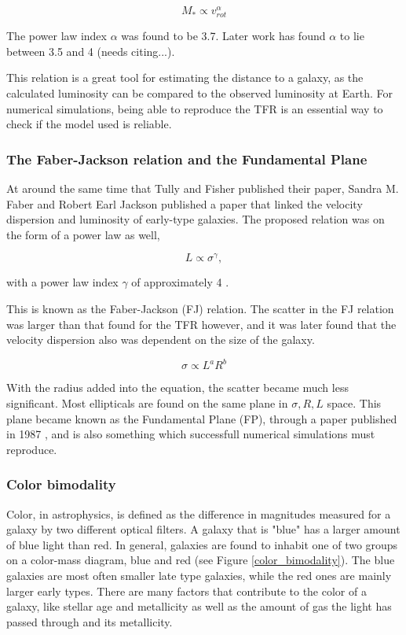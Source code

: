 \begin{equation}
    M_* \propto v_{rot}^\alpha 
\end{equation}

The power law index $\alpha$ was found to be 3.7. Later work has found $\alpha$ to lie between 3.5 and 4 (needs citing...).

This relation is a great tool for estimating the distance to a galaxy, as the calculated luminosity can be compared to the observed luminosity at Earth. For numerical simulations, being able to reproduce the TFR is an essential way to check if the model used is reliable.

\subsubsection{The Faber-Jackson relation and the Fundamental Plane}
At around the same time that Tully and Fisher published their paper, Sandra M. Faber and Robert Earl Jackson published a paper that linked the velocity dispersion and luminosity of early-type galaxies. The proposed relation was on the form of a power law as well,

\begin{equation}
    L \propto \sigma^{\gamma},
\end{equation}

with a power law index $\gamma$ of approximately 4 \parencite{FaberJackson1976}.

This is known as the Faber-Jackson (FJ) relation. The scatter in the FJ relation was larger than that found for the TFR however, and it was later found that the velocity dispersion also was dependent on the size of the galaxy.

\begin{equation}
    \sigma \propto L^a R^b
\end{equation}

With the radius added into the equation, the scatter became much less significant. Most ellipticals are found on the same plane in ${\sigma, R, L}$ space. This plane became known as the Fundamental Plane (FP), through a paper published in 1987 \parencite{Djorgovski1987}, and is also something which successfull numerical simulations must reproduce.

\subsubsection{Color bimodality}
Color, in astrophysics, is defined as the difference in magnitudes measured for a galaxy by two different optical filters. A galaxy that is "blue" has a larger amount of blue light than red. In general, galaxies are found to inhabit one of two groups on a color-mass diagram, blue and red (see Figure \ref{color_bimodality}). The blue galaxies are most often smaller late type galaxies, while the red ones are mainly larger early types. There are many factors that contribute to the color of a galaxy, like stellar age and metallicity as well as the amount of gas the light has passed through and its metallicity.

